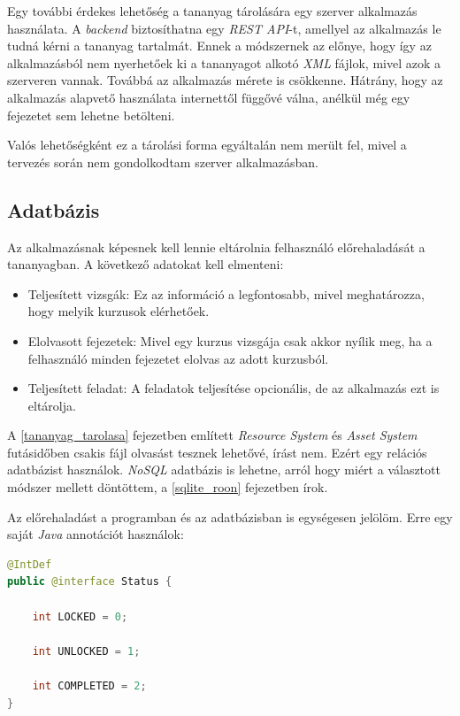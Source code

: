 \documentclass[12pt,a4paper]{article}
\newcommand{\xml}{\textit{XML}\xspace}
\begin{document}
	Egy további érdekes lehetőség a tananyag tárolására egy szerver alkalmazás használata. A \textit{backend} biztosíthatna egy \textit{REST API}-t, amellyel az alkalmazás le tudná kérni a tananyag tartalmát. Ennek a módszernek az előnye, hogy így az alkalmazásból nem nyerhetőek ki a tananyagot alkotó \xml fájlok, mivel azok a szerveren vannak. Továbbá az alkalmazás mérete is csökkenne. Hátrány, hogy az alkalmazás alapvető használata internettől függővé válna, anélkül még egy fejezetet sem lehetne betölteni. 
	
	Valós lehetőségként ez a tárolási forma egyáltalán nem merült fel, mivel a tervezés során nem gondolkodtam szerver alkalmazásban.
	
	\subsection{Adatbázis}
	
	Az alkalmazásnak képesnek kell lennie eltárolnia felhasználó előrehaladását a tananyagban. A következő adatokat kell elmenteni:
	
	\begin{itemize}
		\item Teljesített vizsgák: Ez az információ a legfontosabb, mivel meghatározza, hogy melyik kurzusok elérhetőek.
		\item Elolvasott fejezetek: Mivel egy kurzus vizsgája csak akkor nyílik meg, ha a felhasználó minden fejezetet elolvas az adott kurzusból.
		\item Teljesített feladat: A feladatok teljesítése opcionális, de az alkalmazás ezt is eltárolja.
	\end{itemize}
	
	A \ref{tananyag_tarolasa} fejezetben említett \textit{Resource System} és \textit{Asset System} futásidőben csakis fájl olvasást tesznek lehetővé, írást nem. Ezért egy relációs adatbázist használok. \textit{NoSQL} adatbázis is lehetne, arról hogy miért a választott módszer mellett döntöttem, a \ref{sqlite_roon} fejezetben írok.
	
	Az előrehaladást a programban és az adatbázisban is egységesen jelölöm. Erre egy saját \textit{Java} annotációt használok:
	
	\begin{lstlisting}[language=Java]
@IntDef
public @interface Status {

	int LOCKED = 0;
		
	int UNLOCKED = 1;
		
	int COMPLETED = 2;
}
	\end{lstlisting}
	
\end{document}
